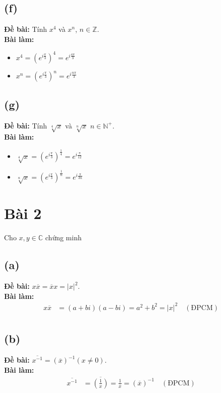 \subsection{(f)}
\textbf{Đề bài:} Tính $x^{4}$ và $x^{n}$, $n\in\mathbb{Z}$.\\
\textbf{Bài làm:}
\begin{itemize}
    \item $x^{4} = \left(e^{i\frac{\pi}{3}}\right)^4 = e^{i\frac{4\pi}{3}}$
    \item $x^{n} = \left(e^{i\frac{\pi}{3}}\right)^{n} = e^{i\frac{n\pi}{3}}$
\end{itemize}

\subsection{(g)}
\textbf{Đề bài:} Tính $\sqrt[4]{x}$ và $\sqrt[n]{x}$ $n\in\mathbb{N}^{+}$.\\
\textbf{Bài làm:}
\begin{itemize}
    \item $\sqrt[4]{x} = \left(e^{i\frac{\pi}{3}}\right)^{\frac{1}{4}} = e^{i\frac{\pi}{12}}$
    \item $\sqrt[n]{x} = \left(e^{i\frac{\pi}{3}}\right)^{\frac{1}{n}} = e^{i\frac{\pi}{3n}}$
\end{itemize}

\section{Bài 2}
Cho $x, y\in\mathbb{C}$ chứng minh

\subsection{(a)}
\textbf{Đề bài:} $x\overline{x}=\overline{x}x=|x|^{2}$.\\
\textbf{Bài làm:}
\begin{align*}
    x \overline{x} & = (a + bi)(a - bi) = a^{2} + b^{2} = |x|^{2} \quad (\text{ĐPCM}) \\
\end{align*}

\subsection{(b)}
\textbf{Đề bài:} $\overline{x^{-1}}=(\overline{x})^{-1}(x\ne0)$.\\
\textbf{Bài làm:}
\begin{align*}
    \overline{x^{-1}} & = \overline{\left(\frac{1}{x}\right)} = \frac{1}{\overline{x}} = (\overline{x})^{-1} \quad (\text{ĐPCM}) \\
\end{align*}

